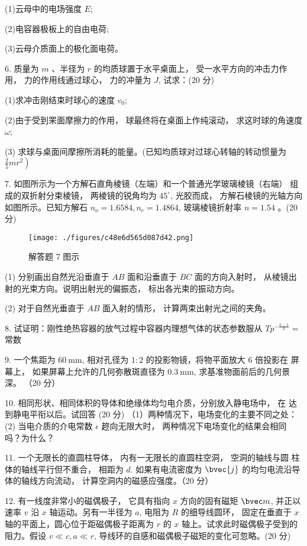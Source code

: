 (1)云母中的电场强度 $E$;

(2)电容器极板上的自由电荷;

(3)云母介质面上的极化面电荷。

6. 质量为 $m$ 、半径为 $r$ 的均质球置于水平桌面上， 受一水平方向的冲击力作用， 力的作用线通过球心， 力的冲量为 $J$, 试求：(20 分)

(1)求冲击刚结束时球心的速度 $v_{0}$;

(2)由于受到䍒面摩擦力的作用， 球最终将在桌面上作纯滚动， 求这时球的角速度 $\omega$;

(3) 求球与桌面间摩擦所消耗的能量。(已知均质球对过球心转轴的转动惯量为 $\left.\frac{2}{5} m r^{2}\right)$

7. 如图所示为一个方解石直角棱镜（左端）和一个普通光学玻璃棱镜（右端） 组成的双折射分束棱镜， 两棱镜的锐角均为 $45^{\circ}$, 光胶而成， 方解石棱镜的光轴方向如图所示。已知方解石 $n_{o}=1.6584, n_{e}=1.4864$, 玻璃棱镜折射率 $n=1.54$ 。(20 分)
\begin{figure}[ht]
\centering
\texttt{[image: ./figures/c48e6d565d087d42.png]}
\caption{解答题 7 图示} \label{fig_FDU15_3}
\end{figure}
(1) 分别画出自然光沿垂直于 $A B$ 面和沿垂直于 $B C$ 面的方向入射时， 从棱镜出射的光束方向。说明出射光的偏振态， 标出各光束的振动方向。

(2) 对于自然光垂直于 $A B$ 面入射的情形， 计算两束出射光之间的夹角。

8. 试证明：刚性绝热容器的放气过程中容器内理想气体的状态参数服从 $T p^{-\frac{k-1}{k}}=$ 常数

9. 一个焦距为 $60 \mathrm{~mm}$, 相对孔径为 $1: 2$ 的投影物镜，将物平面放大 $6$ 倍投影在 屏幕上， 如果屏幕上允许的几何弥散斑直径为 $0.3 \mathrm{~mm}$, 求基准物面前后的几何景深。
（20 分）

10. 相同形状、相同体积的导体和绝缘体均匀电介质，分别放入静电场中， 在 达到静电平衔以后。试回答
(20 分)
（1）两种情况下，电场变化的主要不同之处：
(2) 当电介质的介电常数 $\epsilon$ 趂向无限大时， 两种情况下电场变化的结果会相同吗？为什么？

11. 一个无限长的直圆柱导体， 内有一无限长的直圆柱空洞， 空洞的轴线与圆 柱体的轴线平行但不重合， 相距为 $d$. 如果有电流密度为 $\bvec{j}$ 的均匀电流沿导体的轴线方向流动， 计算空洞内的磁感应强度。（20 分）

12. 有一线度非常小的磁偶极子， 它具有指向 $x$ 方向的固有磁矩 $\bvec m$, 并正以速率 $v$ 沿 $x$ 轴运动。另有一半径为 $a$, 电阻为 $R$ 的细导线圆环， 固定在垂直于 $x$ 轴的平面上，圆心位于距磁偶极子距离为 $r$ 的 $x$ 轴上。试求此时磁偶极子受到的阻力。假设 $v \ll c, a \ll r$, 导线环的自感和磁偶极子磁矩的变化可忽略。(20 分)